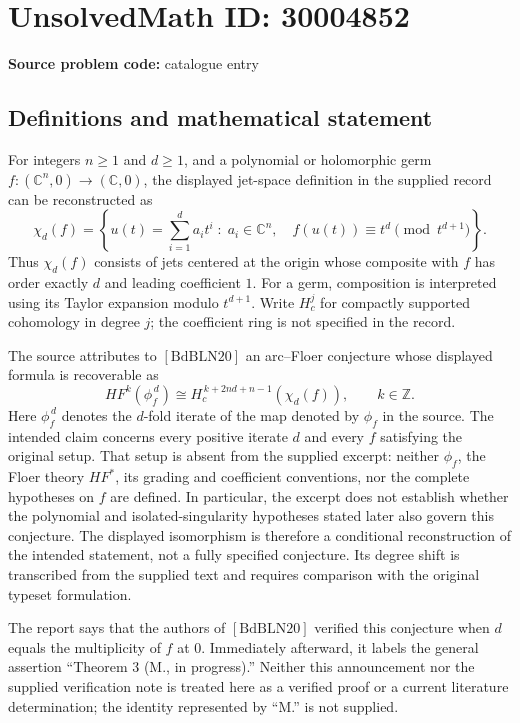 \documentclass[11pt]{article}
\newcommand{\Z}{\mathbb{Z}}
\newcommand{\C}{\mathbb{C}}
\begin{document}
\section*{UnsolvedMath ID: 30004852}
\textbf{Source problem code:} catalogue entry
\subsection{Definitions and mathematical statement}
For integers \(n\geq 1\) and \(d\geq 1\), and a polynomial or holomorphic germ \(f\colon (\C^n,0)\to(\C,0)\), the displayed jet-space definition in the supplied record can be reconstructed as
\[
\chi_d(f)=\left\{u(t)=\sum_{i=1}^{d}a_i t^i\;:\;a_i\in\C^n,\quad f(u(t))\equiv t^d\pmod{t^{d+1}}\right\}.
\]
Thus \(\chi_d(f)\) consists of jets centered at the origin whose composite with \(f\) has order exactly \(d\) and leading coefficient \(1\). For a germ, composition is interpreted using its Taylor expansion modulo \(t^{d+1}\). Write \(H_c^j\) for compactly supported cohomology in degree \(j\); the coefficient ring is not specified in the record.

The source attributes to \([\mathrm{BdBLN20}]\) an arc--Floer conjecture whose displayed formula is recoverable as
\[
HF^k(\phi_f^{\,d})\cong H_c^{\,k+2nd+n-1}(\chi_d(f)),\qquad k\in\Z.
\]
Here \(\phi_f^{\,d}\) denotes the \(d\)-fold iterate of the map denoted by \(\phi_f\) in the source. The intended claim concerns every positive iterate \(d\) and every \(f\) satisfying the original setup. That setup is absent from the supplied excerpt: neither \(\phi_f\), the Floer theory \(HF^*\), its grading and coefficient conventions, nor the complete hypotheses on \(f\) are defined. In particular, the excerpt does not establish whether the polynomial and isolated-singularity hypotheses stated later also govern this conjecture. The displayed isomorphism is therefore a conditional reconstruction of the intended statement, not a fully specified conjecture. Its degree shift is transcribed from the supplied text and requires comparison with the original typeset formulation.

The report says that the authors of \([\mathrm{BdBLN20}]\) verified this conjecture when \(d\) equals the multiplicity of \(f\) at \(0\). Immediately afterward, it labels the general assertion ``Theorem 3 (M., in progress).'' Neither this announcement nor the supplied verification note is treated here as a verified proof or a current literature determination; the identity represented by ``M.'' is not supplied.
\end{document}
